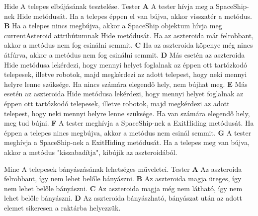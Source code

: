 \documentclass[../../projlab]{subfiles}
\begin{document}
\begin{use-case}
    {Hide}
    {A telepes elbújásának tesztelése.}
    {Tester} 
    \textbf{A} A tester hívja meg a SpaceShip-nek Hide metódusát. Ha a telepes éppen el van bújva, akkor visszatér a metódus. \newline
    \textbf{B} Ha a telepes nincs megbújva, akkor a SpaceShip objektum hívja meg currentAsteroid attribútumnak Hide metódusát. Ha az aszteroida már felrobbant, akkor a metódus nem fog csinálni semmit. \newline
    \textbf{C} Ha az aszteroida köpenye még nincs átfúrva, akkor a metódus nem fog csinálni semmit. \newline
    \textbf{D} Más esetén az aszteroida Hide metódusa lekérdezi, hogy mennyi helyet foglalnak az éppen ott tartózkodó telepesek, illetve robotok, majd megkérdezi az adott telepest, hogy neki mennyi helyre lenne szüksége. Ha nincs számára elegendő hely, nem bújhat meg.    \newline
    \textbf{E} Más esetén az aszteroida Hide metódusa lekérdezi, hogy mennyi helyet foglalnak az éppen ott tartózkodó telepesek, illetve robotok, majd megkérdezi az adott telepest, hogy neki mennyi helyre lenne szüksége. Ha van számára elegendő hely, meg tud bújni.    \newline
    \textbf{F} A tester meghívja a SpaceShip-nek a ExitHiding metódusát. Ha éppen a telepes nincs megbújva, akkor a metódus nem csinál semmit. \newline
    \textbf{G} A tester meghívja a SpaceShip-nek a ExitHiding metódusát. Ha a telepes meg van bújva, akkor a metódus "kiszabadítja", kibújik az aszteroidából. \newline \newline
\end{use-case}

\begin{use-case}
    {Mine}
    {A telepesek bányászásának lehetséges műveletei. }
    {Tester} 
    \textbf{A} Az aszteroida felrobbant, így nem lehet belőle bányászni.  \newline
    \textbf{B} Az aszteroida magja üreges, így nem lehet belőle bányászni. \newline
    \textbf{C} Az aszteroida magja még nem látható, így nem lehet belőle bányászni. \newline
    \textbf{D} Az aszteroida bányászható, bányászat után az adott elemet sikeresen a raktárba helyezzük.  \newline

\end{use-case}
\end{document}

